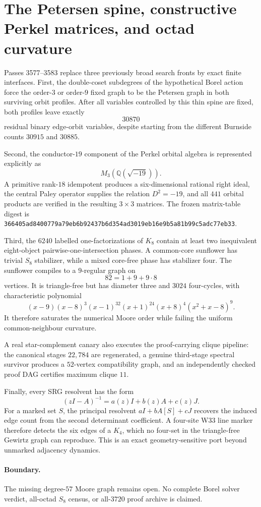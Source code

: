 \section{The Petersen spine, constructive Perkel matrices, and octad curvature}
\label{sec:bt3577-bt3583}

Passes 3577--3583 replace three previously broad search fronts by exact finite interfaces.  First, the double-coset subdegrees of the hypothetical Borel action force the order-$3$ or order-$9$ fixed graph to be the Petersen graph in both surviving orbit profiles.  After all variables controlled by this thin spine are fixed, both profiles leave exactly
\[
30870
\]
residual binary edge-orbit variables, despite starting from the different Burnside counts $30915$ and $30885$.

Second, the conductor-$19$ component of the Perkel orbital algebra is represented explicitly as
\[
M_3\!\left(\mathbb Q(\sqrt{-19})\right).
\]
A primitive rank-$18$ idempotent produces a six-dimensional rational right ideal, the central Paley operator supplies the relation $D^2=-19$, and all $441$ orbital products are verified in the resulting $3\times3$ matrices.  The frozen matrix-table digest is
\texttt{366405ad8400779a79eb6b92437b6d354ad3019eb16e9b5a81b99c5adc77eb33}.

Third, the $6240$ labelled one-factorizations of $K_8$ contain at least two inequivalent eight-object pairwise-one-intersection phases.  A common-core sunflower has trivial $S_8$ stabilizer, while a mixed core-free phase has stabilizer four.  The sunflower compiles to a $9$-regular graph on
\[
82=1+9+9\cdot8
\]
vertices.  It is triangle-free but has diameter three and $3024$ four-cycles, with characteristic polynomial
\[
(x-9)(x-8)^3(x-1)^{32}(x+1)^{24}(x+8)^4(x^2+x-8)^9.
\]
It therefore saturates the numerical Moore order while failing the uniform common-neighbour curvature.

A real star-complement canary also executes the proof-carrying clique pipeline: the canonical stages $22,784$ are regenerated, a genuine third-stage spectral survivor produces a $52$-vertex compatibility graph, and an independently checked proof DAG certifies maximum clique $11$.

Finally, every SRG resolvent has the form
\[
(zI-A)^{-1}=a(z)I+b(z)A+c(z)J.
\]
For a marked set $S$, the principal resolvent $aI+bA[S]+cJ$ recovers the induced edge count from the second determinant coefficient.  A four-site W33 line marker therefore detects the six edges of a $K_4$, which no four-set in the triangle-free Gewirtz graph can reproduce.  This is an exact geometry-sensitive port beyond unmarked adjacency dynamics.

\paragraph{Boundary.}
The missing degree-$57$ Moore graph remains open.  No complete Borel solver verdict, all-octad $S_8$ census, or all-$3720$ proof archive is claimed.
